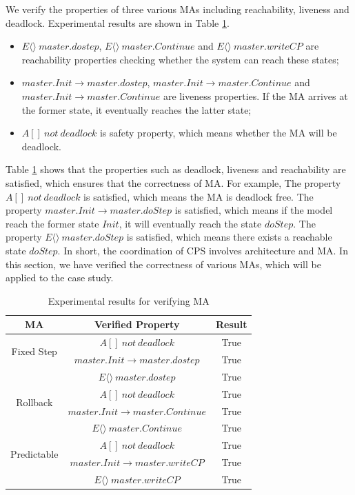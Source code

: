 We verify the properties of three various MAs including reachability, liveness and deadlock. Experimental results are shown in Table \ref{ta_r}.

\begin{itemize}
\item
$E \langle\rangle ~master.dostep$, $E\langle\rangle~master.Continue$ and $E\langle\rangle~master.writeCP$ are reachability properties checking whether the system can reach these states;
\item
$master.Init \rightarrow master.dostep$, $master.Init \rightarrow master.Continue$ and $master.Init \rightarrow master.Continue$ are liveness properties. If the MA arrives at the former state, it eventually reaches the latter state;
\item
$A[]~not~deadlock$ is safety property, which means whether the MA will be deadlock.
\end{itemize}

Table \ref{ta_r} shows that the properties such as deadlock, liveness and reachability are satisfied, which ensures that the correctness of MA. For example, The property $A[]~not~deadlock$ is satisfied, which means the MA is deadlock free. The property $master.Init \rightarrow master.doStep$ is satisfied, which means if the model reach the former state $Init$, it will eventually reach the state $doStep$. The property $E\langle\rangle~master.doStep$ is satisfied, which means there exists a reachable state $doStep$.  In short, the coordination of CPS involves architecture and MA. In this section, we have verified the correctness of various MAs, which will be applied to the case study.
\begin{table}
\caption{Experimental results for verifying MA}
\centering
\begin{tabular}{c c c}
        \hline
        MA & Verified Property & Result\\
        \hline
        \multirow{2}{2.0cm}{Fixed Step}
                & $A[]~not~deadlock$ & True\\
                & $master.Init \rightarrow master.dostep$ & True\\
                & $E\langle\rangle~master.dostep$ & True\\

        \hline
        \multirow{2}{2.0cm}{Rollback}
                & $A[]~not~deadlock$ & True\\
                & $master.Init \rightarrow master.Continue$ & True\\
                & $E\langle\rangle~master.Continue$ & True\\

        \hline
        \multirow{2}{2.0cm}{Predictable}
                & $A[]~not~deadlock$ & True\\
                & $master.Init \rightarrow  master.writeCP$ & True\\
                & $E\langle\rangle~master.writeCP$ & True\\
        \hline
\end{tabular}
\label{ta_r}
\end{table}

